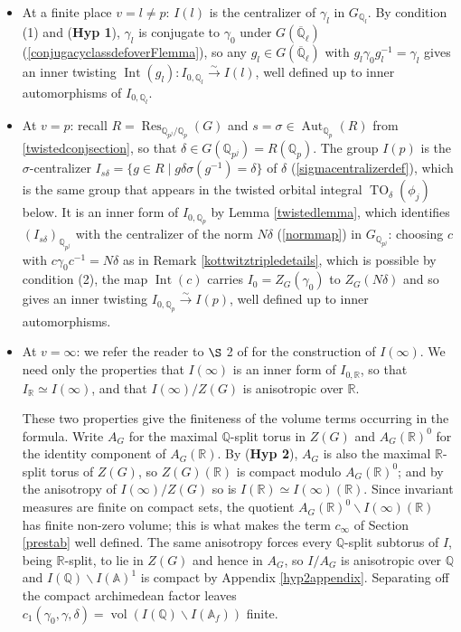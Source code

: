 \documentclass[11pt,a4paper]{article}
\newcommand{\HypOne}{\textbf{Hyp 1}}
\newcommand{\HypTwo}{\textbf{Hyp 2}}
\theoremstyle{definition}
\theoremstyle{plain}
\theoremstyle{remark}
\theoremstyle{plain}
\DeclareMathOperator{\vol}{vol}
\DeclareMathOperator{\Aut}{Aut}
\DeclareMathOperator{\Int}{Int}
\DeclareMathOperator{\Res}{Res}
\DeclareMathOperator{\TO}{TO}
\begin{document}
\begin{itemize}
    \item At a finite place $v = l \neq p$: $I(l)$ is the centralizer of $\gamma_l$ in $G_{\mathbb{Q}_l}$. By condition (1) and (\HypOne{}), $\gamma_l$ is conjugate to $\gamma_0$ under $G(\overline{\mathbb{Q}}_\ell)$ (\ref{conjugacyclassdefoverFlemma}), so any $g_l \in G(\overline{\mathbb{Q}}_\ell)$ with $g_l \gamma_0 g_l^{-1} = \gamma_l$ gives an inner twisting $\Int(g_l) : I_{0,\mathbb{Q}_l} \xrightarrow{\sim} I(l)$, well defined up to inner automorphisms of $I_{0,\mathbb{Q}_l}$.
    \item At $v = p$: recall $R = \Res_{\mathbb{Q}_{p^j}/\mathbb{Q}_p}(G)$ and $s = \sigma \in \Aut_{\mathbb{Q}_p}(R)$ from \ref{twistedconjsection}, so that $\delta \in G(\mathbb{Q}_{p^j}) = R(\mathbb{Q}_p)$. The group $I(p)$ is the $\sigma$-centralizer $I_{s\delta} = \{ g \in R \mid g \delta \sigma(g^{-1}) = \delta \}$ of $\delta$ (\ref{sigmacentralizerdef}), which is the same group that appears in the twisted orbital integral $\TO_{\delta}(\phi_j)$ below. It is an inner form of $I_{0,\mathbb{Q}_p}$ by Lemma \ref{twistedlemma}, which identifies $(I_{s\delta})_{\mathbb{Q}_{p^j}}$ with the centralizer of the norm $N\delta$ (\ref{normmap}) in $G_{\mathbb{Q}_{p^j}}$: choosing $c$ with $c \gamma_0 c^{-1} = N\delta$ as in Remark \ref{kottwitztripledetails}, which is possible by condition (2), the map $\Int(c)$ carries $I_0 = Z_G(\gamma_0)$ to $Z_G(N\delta)$ and so gives an inner twisting $I_{0,\mathbb{Q}_p} \xrightarrow{\sim} I(p)$, well defined up to inner automorphisms.
    \item At $v = \infty$: we refer the reader to $\S$ 2 of \cite{MR1044820} for the construction of $I(\infty)$. We need only the properties that $I(\infty)$ is an inner form of $I_{0,\mathbb{R}}$, so that $I_{\mathbb{R}} \simeq I(\infty)$, and that $I(\infty)/Z(G)$ is anisotropic over $\mathbb{R}$.

    These two properties give the finiteness of the volume terms occurring in the formula. Write $A_G$ for the maximal $\mathbb{Q}$-split torus in $Z(G)$ and $A_G(\mathbb{R})^0$ for the identity component of $A_G(\mathbb{R})$. By (\HypTwo{}), $A_G$ is also the maximal $\mathbb{R}$-split torus of $Z(G)$, so $Z(G)(\mathbb{R})$ is compact modulo $A_G(\mathbb{R})^0$; and by the anisotropy of $I(\infty)/Z(G)$ so is $I(\mathbb{R}) \simeq I(\infty)(\mathbb{R})$. Since invariant measures are finite on compact sets, the quotient $A_G(\mathbb{R})^0 \backslash I(\infty)(\mathbb{R})$ has finite non-zero volume; this is what makes the term $c_{\infty}$ of Section \ref{prestab} well defined. The same anisotropy forces every $\mathbb{Q}$-split subtorus of $I$, being $\mathbb{R}$-split, to lie in $Z(G)$ and hence in $A_G$, so $I/A_G$ is anisotropic over $\mathbb{Q}$ and $I(\mathbb{Q}) \backslash I(\mathbb{A})^1$ is compact by Appendix \ref{hyp2appendix}. Separating off the compact archimedean factor leaves $c_1(\gamma_0, \gamma, \delta) = \vol(I(\mathbb{Q}) \backslash I(\mathbb{A}_f))$ finite.
\end{itemize}
\end{document}
